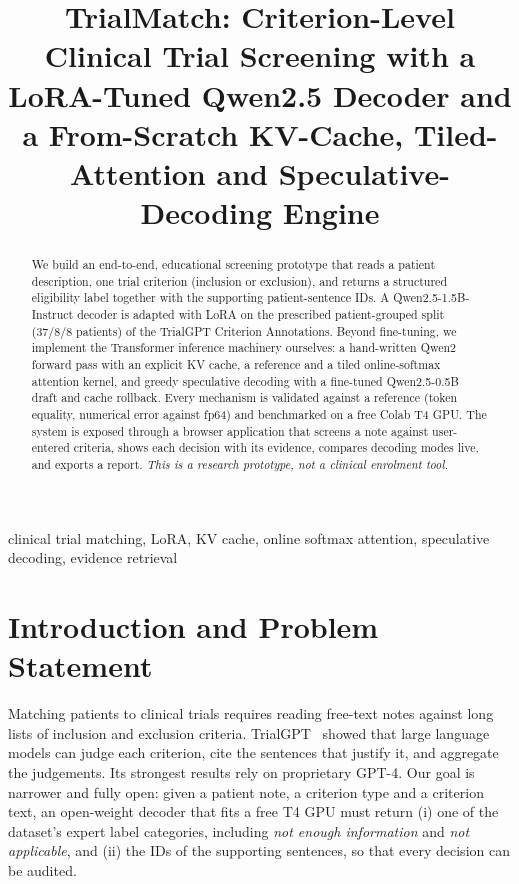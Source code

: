 \documentclass[conference]{IEEEtran}
\begin{document}
\title{TrialMatch: Criterion-Level Clinical Trial Screening with a LoRA-Tuned Qwen2.5 Decoder and a From-Scratch KV-Cache, Tiled-Attention and Speculative-Decoding Engine}

\author{
}

\maketitle

\begin{abstract}
We build an end-to-end, educational screening prototype that reads a patient description, one trial criterion (inclusion or exclusion), and returns a structured eligibility label together with the supporting patient-sentence IDs. A Qwen2.5-1.5B-Instruct decoder is adapted with LoRA on the prescribed patient-grouped split (37/8/8 patients) of the TrialGPT Criterion Annotations. Beyond fine-tuning, we implement the Transformer inference machinery ourselves: a hand-written Qwen2 forward pass with an explicit KV cache, a reference and a tiled online-softmax attention kernel, and greedy speculative decoding with a fine-tuned Qwen2.5-0.5B draft and cache rollback. Every mechanism is validated against a reference (token equality, numerical error against fp64) and benchmarked on a free Colab T4 GPU. The system is exposed through a browser application that screens a note against user-entered criteria, shows each decision with its evidence, compares decoding modes live, and exports a report. \emph{This is a research prototype, not a clinical enrolment tool.}
\end{abstract}

\begin{IEEEkeywords}
clinical trial matching, LoRA, KV cache, online softmax attention, speculative decoding, evidence retrieval
\end{IEEEkeywords}

\section{Introduction and Problem Statement}
Matching patients to clinical trials requires reading free-text notes against long lists of inclusion and exclusion criteria. TrialGPT~\cite{trialgpt} showed that large language models can judge each criterion, cite the sentences that justify it, and aggregate the judgements. Its strongest results rely on proprietary GPT-4. Our goal is narrower and fully open: given a patient note, a criterion type and a criterion text, an open-weight decoder that fits a free T4 GPU must return (i) one of the dataset's expert label categories, including \emph{not enough information} and \emph{not applicable}, and (ii) the IDs of the supporting sentences, so that every decision can be audited.
\end{document}
